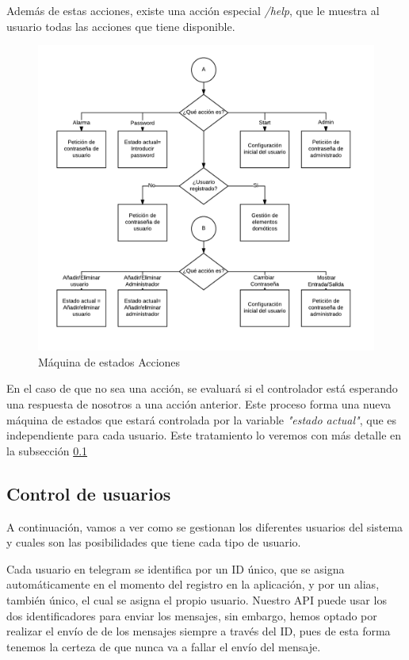 \documentclass[10pt,journal,compsoc]{IEEEtran}
\begin{document}
Además de estas acciones, existe una acción especial \textit{/help}, que le muestra al usuario 
todas las acciones que tiene disponible.

\begin{figure}[h]
\centering
\includegraphics[scale=0.4]{MaqEstAcc}
\caption{Máquina de estados Acciones}
\label{fig:MaqEstAcc}
\end{figure}

En el caso de que no sea una acción, se evaluará si el controlador está esperando una respuesta 
de nosotros a una acción anterior. Este proceso forma una nueva máquina de estados que estará 
controlada por la variable \textit{"estado actual"}, que es independiente para cada usuario.
Este tratamiento lo veremos con más detalle en la subsección \ref{sec:ControlUsuarios}

\subsection{Control de usuarios}\label{sec:ControlUsuarios}

A continuación, vamos a ver como se gestionan los diferentes usuarios del sistema y cuales 
son las posibilidades que tiene cada tipo de usuario.

Cada usuario en telegram se identifica por un ID único, que se asigna automáticamente en 
el momento del registro en la aplicación, y por un alias, también único, el cual se asigna el 
propio usuario. Nuestro API puede usar los dos identificadores para enviar los  mensajes, sin embargo, 
hemos optado por realizar el envío de de los mensajes siempre a través del ID, pues de esta forma 
tenemos la certeza de que nunca va a fallar el envío del mensaje. 
\end{document}
